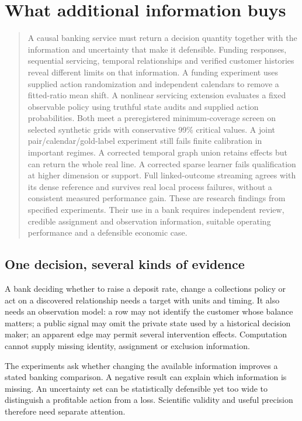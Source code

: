 \chapter{What additional information buys}
\label{integrated:master_execution}

\begin{quote}\small
A causal banking service must return a decision quantity together with the information and uncertainty that make it defensible. Funding responses, sequential servicing, temporal relationships and verified customer histories reveal different limits on that information. A funding experiment uses supplied action randomization and independent calendars to remove a fitted-ratio mean shift. A nonlinear servicing extension evaluates a fixed observable policy using truthful state audits and supplied action probabilities. Both meet a preregistered minimum-coverage screen on selected synthetic grids with conservative 99\% critical values. A joint pair/calendar/gold-label experiment still fails finite calibration in important regimes. A corrected temporal graph union retains effects but can return the whole real line. A corrected sparse learner fails qualification at higher dimension or support. Full linked-outcome streaming agrees with its dense reference and survives real local process failures, without a consistent measured performance gain. These are research findings from specified experiments. Their use in a bank requires independent review, credible assignment and observation information, suitable operating performance and a defensible economic case.
\end{quote}

\section{One decision, several kinds of evidence}
A bank deciding whether to raise a deposit rate, change a collections policy or act on a discovered relationship needs a target with units and timing. It also needs an observation model: a row may not identify the customer whose balance matters; a public signal may omit the private state used by a historical decision maker; an apparent edge may permit several intervention effects. Computation cannot supply missing identity, assignment or exclusion information.

The experiments ask whether changing the available information improves
a stated banking comparison. A negative result can explain which information
is missing. An uncertainty set can be statistically defensible yet too wide
to distinguish a profitable action from a loss. Scientific validity and
useful precision therefore need separate attention.

